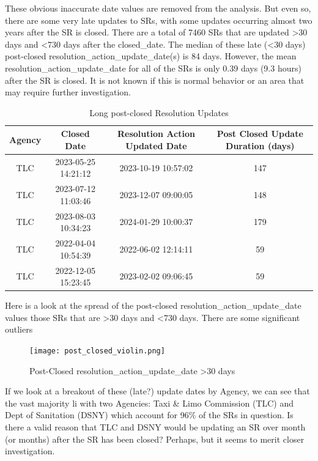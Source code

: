 \documentclass[12pt, titlepage]{article}
\begin{document}
	These obvious inaccurate date values are removed from the analysis. But even so, there are some very late
	updates to SRs, with some updates occurring almost two years after the SR is closed.   There are a total of 7460 SRs that are 
	updated \textgreater{}30 days and \textless{}730 days after the closed\_date. The median of these late (\textless{}30 days)
	post-closed resolution\_action\_update\_date(s) is 84 days. However, the mean resolution\_action\_update\_date 
	for all of the SRs is only 0.39 days (9.3 hours) after the SR is closed. It is not known if this is normal behavior
	or an area that may require further investigation. 
	
	\begin{table}[H]
    \centering
    \footnotesize
	    \begin{tabular}{cccc}
	        \hline
	        Agency & Closed Date & Resolution Action Updated Date & Post Closed Update Duration (days) \\
	        \hline
	        TLC & 2023-05-25 14:21:12 & 2023-10-19 10:57:02 & 147 \\
	        TLC & 2023-07-12 11:03:46 & 2023-12-07 09:00:05 & 148 \\
	        TLC & 2023-08-03 10:34:23 & 2024-01-29 10:00:37 & 179 \\
	        TLC & 2022-04-04 10:54:39 & 2022-06-02 12:14:11 & 59 \\
	        TLC & 2022-12-05 15:23:45 & 2023-02-02 09:06:45 & 59 \\
	        \hline
	    \end{tabular}
    \caption{Long post-closed Resolution Updates}
    \label{tab:resolution}
	\end{table}

	Here is a look at the spread of the post-closed resolution\_action\_update\_date values those SRs 
	that are \textgreater{}30 days and \textless{}730 days. There are some significant outliers 
	
	\begin{figure}[H]
		 \centering
		 \texttt{[image: post\_closed\_violin.png]}
		 \caption{Post-Closed resolution\_action\_update\_date >30 days }
		 \label{fig:resolution-violin}
	\end{figure}		

	If we look at a breakout of these (late?) update dates by Agency, we can see that the vast majority li with two
	Agencies: Taxi \& Limo Commission (TLC) and Dept of Sanitation (DSNY) which account for 96\% of the SRs in
	question.  Is there a valid reason that TLC and DSNY would be updating an SR over month (or months) after
	the SR has been closed? Perhaps, but it seems to merit closer investigation. 
\end{document}

